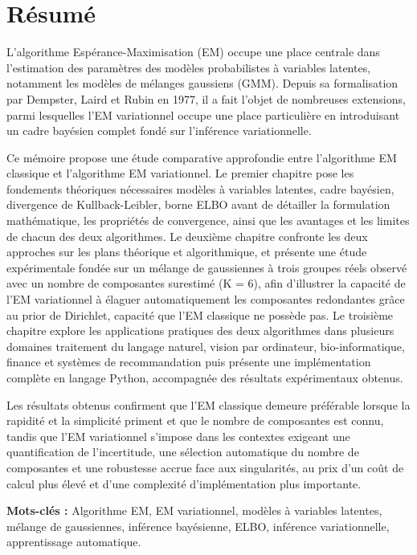 
\chapter*{Résumé}
L'algorithme Espérance-Maximisation (EM) occupe une place centrale dans l'estimation des paramètres des modèles probabilistes à variables latentes, notamment les modèles de mélanges gaussiens (GMM). Depuis sa formalisation par Dempster, Laird et Rubin en 1977, il a fait l'objet de nombreuses extensions, parmi lesquelles l'EM variationnel occupe une place particulière en introduisant un cadre bayésien complet fondé sur l'inférence variationnelle.

Ce mémoire propose une étude comparative approfondie entre l'algorithme EM classique et l'algorithme EM variationnel. Le premier chapitre pose les fondements théoriques nécessaires  modèles à variables latentes, cadre bayésien, divergence de Kullback-Leibler, borne ELBO  avant de détailler la formulation mathématique, les propriétés de convergence, ainsi que les avantages et les limites de chacun des deux algorithmes. Le deuxième chapitre confronte les deux approches sur les plans théorique et algorithmique, et présente une étude expérimentale fondée sur un mélange de gaussiennes à trois groupes réels observé avec un nombre de composantes surestimé (K = 6), afin d'illustrer la capacité de l'EM variationnel à élaguer automatiquement les composantes redondantes grâce au prior de Dirichlet, capacité que l'EM classique ne possède pas. Le troisième chapitre explore les applications pratiques des deux algorithmes dans plusieurs domaines  traitement du langage naturel, vision par ordinateur, bio-informatique, finance et systèmes de recommandation  puis présente une implémentation complète en langage Python, accompagnée des résultats expérimentaux obtenus.

Les résultats obtenus confirment que l'EM classique demeure préférable lorsque la rapidité et la simplicité priment et que le nombre de composantes est connu, tandis que l'EM variationnel s'impose dans les contextes exigeant une quantification de l'incertitude, une sélection automatique du nombre de composantes et une robustesse accrue face aux singularités, au prix d'un coût de calcul plus élevé et d'une complexité d'implémentation plus importante.

\textbf{Mots-clés : }Algorithme EM, EM variationnel, modèles à variables latentes, mélange de gaussiennes, inférence bayésienne, ELBO, inférence variationnelle, apprentissage automatique.


